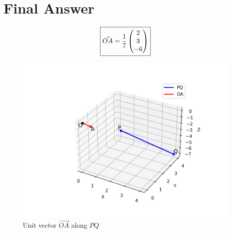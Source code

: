 \documentclass[12pt]{article}
\begin{document}
\section*{Final Answer}
\[
\boxed{\Vec{OA} = \frac{1}{7}\begin{pmatrix}2 \\ 3 \\ -6\end{pmatrix}}
\]

\begin{figure}[h!]
    \centering
    \includegraphics[width=0.6\linewidth]{figs/fig.png}
    \caption{Unit vector $\Vec{OA}$ along $PQ$}
\end{figure}
\end{document}
